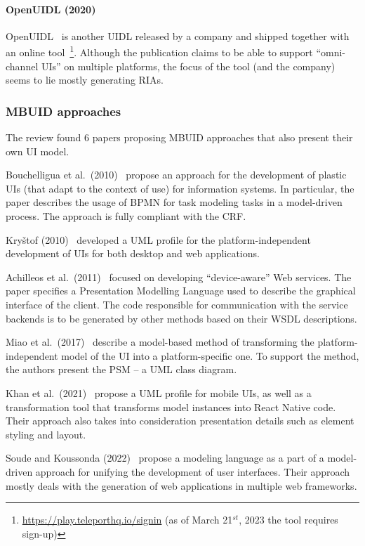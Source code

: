 \paragraph{OpenUIDL (2020)}
OpenUIDL~\cite{Moldovan2020} is another UIDL released by a company and shipped together with an online tool~\footnote{\url{https://play.teleporthq.io/signin} (as of March 21$^{st}$, 2023 the tool requires sign-up)}.
Although the publication claims to be able to support \enquote{omni-channel UIs} on multiple platforms, the focus of the tool (and the company) seems to lie mostly generating RIAs.

\subsubsection{MBUID approaches}

The review found 6 papers proposing MBUID approaches that also present their own UI model.

Bouchelligua et al.\ (2010)~\cite{Bouchelligua2010} propose an approach for the development of plastic UIs (that adapt to the context of use) for information systems.
In particular, the paper describes the usage of BPMN for task modeling tasks in a model-driven process.
The approach is fully compliant with the CRF\@.

Kryštof (2010)~\cite{kryvstof2010lpgm} developed a UML profile for the platform-independent development of UIs for both desktop and web applications.

Achilleos et al.\ (2011)~\cite{Achilleos2011} focused on developing \enquote{device-aware} Web services.
The paper specifies a Presentation Modelling Language used to describe the graphical interface of the client.
The code responsible for communication with the service backends is to be generated by other methods based on their WSDL descriptions.

Miao et al.\ (2017)~\cite{Miao2017} describe a model-based method of transforming the platform-independent model of the UI into a platform-specific one.
To support the method, the authors present the PSM -- a UML class diagram.

Khan et al.\ (2021)~\cite{Khan2021} propose a UML profile for mobile UIs, as well as a transformation tool that transforms model instances into React Native code.
Their approach also takes into consideration presentation details such as element styling and layout.

Soude and Koussonda (2022)~\cite{Soude2022} propose a modeling language as a part of a model-driven approach for unifying the development of user interfaces.
Their approach mostly deals with the generation of web applications in multiple web frameworks.

